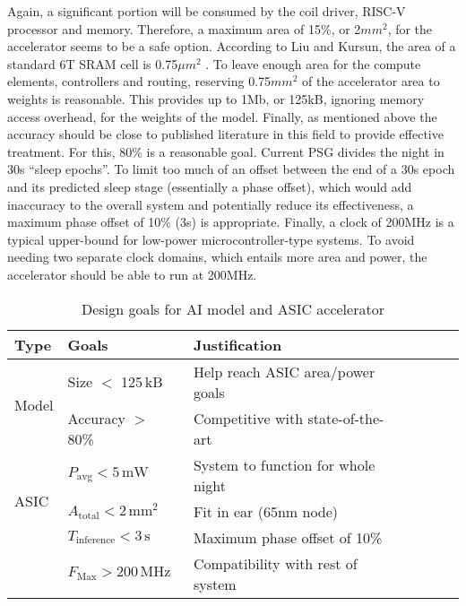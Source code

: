 \documentclass[12pt]{article}
\begin{document}
Again, a significant portion will be consumed by the coil driver, RISC-V processor and memory. Therefore, a maximum area of 15\%, or 2$mm^2$, for the accelerator seems to be a safe
option. According to Liu and Kursun, the area of a standard 6T SRAM cell is 0.75$\mu m^2$ \cite*{liu2008characterization}. To leave enough area for the compute elements, controllers
and routing, reserving 0.75$mm^2$ of the accelerator area to weights is reasonable. This provides up to 1Mb, or 125kB, ignoring memory access overhead, for the weights of the model.
Finally, as mentioned above the accuracy should be close to published literature in this field to provide effective treatment. For this, 80\% is a reasonable goal. Current PSG divides
the night in 30s ``sleep epochs''. To limit too much of an offset between the end of a 30s epoch and its predicted sleep stage (essentially a phase offset), which would add inaccuracy to
the overall system and potentially reduce its effectiveness, a maximum phase offset of 10\% (3s) is appropriate. Finally, a clock of 200MHz is a typical upper-bound for low-power
microcontroller-type systems. To avoid needing two separate clock domains, which entails more area and power, the accelerator should be able to run at 200MHz.

\begin{table}
    \centering
    \renewcommand{\arraystretch}{1.2} %
    \setlength{\arrayrulewidth}{1.5pt} %
    \caption{Design goals for AI model and ASIC accelerator}
    \begin{tabular}{@{} *7l @{}}
        \toprule
        Type        & Goals                                     & Justification &&&  \\\midrule
        \multirow{2}{*}{Model}
                    & Size $<$ 125\,kB                          & Help reach ASIC area/power goals \\
                    & Accuracy $>$ 80\%                         & Competitive with state-of-the-art \\ \bottomrule
        \multirow{3}{*}{ASIC}
                    & $P_{\mathrm{avg}} < 5\,\mathrm{mW}$       & System to function for whole night \\
                    & $A_{\mathrm{total}} < 2\,\mathrm{mm}^2$   & Fit in ear (65nm node) \\
                    & $T_{\mathrm{inference}} < 3\,\mathrm{s}$  & Maximum phase offset of 10\% \\
                    & $F_{\mathrm{Max}} > 200\,\mathrm{MHz}$    & Compatibility with rest of system \\
        \hline
    \end{tabular}
    \label{tab:design_goals}
\end{table}
\end{document}
